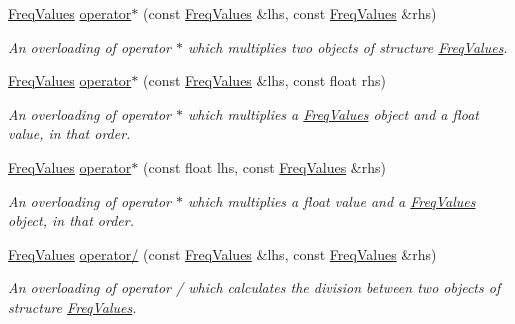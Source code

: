 \begin{DoxyCompactItemize}
\hyperlink{structFreqValues}{Freq\+Values} \hyperlink{structFreqValues_a3e567844a5d4347e3b30e696132bfb7c}{operator$\ast$} (const \hyperlink{structFreqValues}{Freq\+Values} \&lhs, const \hyperlink{structFreqValues}{Freq\+Values} \&rhs)
\begin{DoxyCompactList}\small\item\em An overloading of operator $\ast$ which multiplies two objects of structure {\itshape \hyperlink{structFreqValues}{Freq\+Values}}. \end{DoxyCompactList}\item 
\mbox{\label{structFreqValues_aea565aadf51307e09845c72179e5082d}} 
\hyperlink{structFreqValues}{Freq\+Values} \hyperlink{structFreqValues_aea565aadf51307e09845c72179e5082d}{operator$\ast$} (const \hyperlink{structFreqValues}{Freq\+Values} \&lhs, const float rhs)
\begin{DoxyCompactList}\small\item\em An overloading of operator $\ast$ which multiplies a {\itshape \hyperlink{structFreqValues}{Freq\+Values}} object and a {\itshape float} value, in that order. \end{DoxyCompactList}\item 
\mbox{\label{structFreqValues_ab9bb62425b97f45a5eb485cf745bfe4a}} 
\hyperlink{structFreqValues}{Freq\+Values} \hyperlink{structFreqValues_ab9bb62425b97f45a5eb485cf745bfe4a}{operator$\ast$} (const float lhs, const \hyperlink{structFreqValues}{Freq\+Values} \&rhs)
\begin{DoxyCompactList}\small\item\em An overloading of operator $\ast$ which multiplies a {\itshape float} value and a {\itshape \hyperlink{structFreqValues}{Freq\+Values}} object, in that order. \end{DoxyCompactList}\item 
\mbox{\label{structFreqValues_a26f13922dd72ad292bea45072abc2c96}} 
\hyperlink{structFreqValues}{Freq\+Values} \hyperlink{structFreqValues_a26f13922dd72ad292bea45072abc2c96}{operator/} (const \hyperlink{structFreqValues}{Freq\+Values} \&lhs, const \hyperlink{structFreqValues}{Freq\+Values} \&rhs)
\begin{DoxyCompactList}\small\item\em An overloading of operator / which calculates the division between two objects of structure {\itshape \hyperlink{structFreqValues}{Freq\+Values}}. \end{DoxyCompactList}\item 

\end{DoxyCompactItemize}
